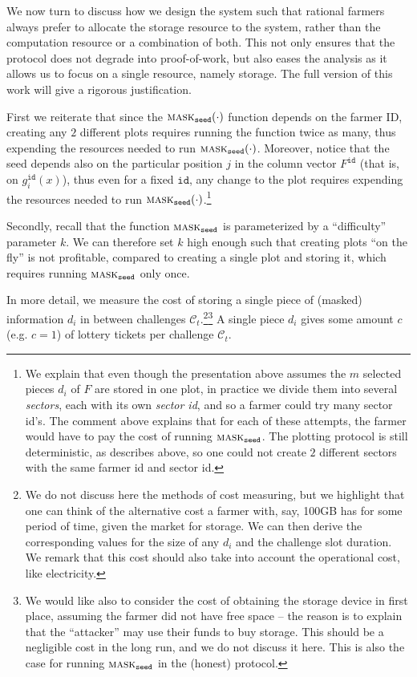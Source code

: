 \documentclass[conference]{IEEEtran}
\newcommand{\id}{\texttt{id}}
\newcommand{\seed}{\texttt{seed}}
\newcommand{\mask}{\textsc{mask}}
\begin{document}
We now turn to discuss how we design the system such that rational farmers always prefer to allocate the storage resource to the system, rather than the computation resource or a combination of both. This not only ensures that the protocol does not degrade into proof-of-work, but also eases the analysis as it allows us to focus on a single resource, namely storage. The full version of this work will give a rigorous justification.

First we reiterate that since the $\mask_{\seed}(\cdot)$ function depends on the farmer ID, creating any $2$ different plots requires running the function twice as many, thus expending the resources needed to run $\mask_{\seed}(\cdot)$. Moreover, notice that the seed depends also on the particular position $j$ in the column vector $F^{\id}$ (that is, on $g_i^{\id}(x)$), thus even for a fixed $\id$, any change to the plot requires expending the resources needed to run $\mask_{\seed}(\cdot)$.\footnote{We explain that even though the presentation above assumes the $m$ selected pieces $d_i$ of $F$ are stored in one plot, in practice we divide them into several \emph{sectors}, each with its own \emph{sector id}, and so a farmer could try many sector id's. The comment above explains that for each of these attempts, the farmer would have to pay the cost of running $\mask_{\seed}$. The plotting protocol is still deterministic, as describes above, so one could not create $2$ different sectors with the same farmer id and sector id.}

Secondly, recall that the function $\mask_{\seed}$ is parameterized by a ``difficulty'' parameter $k$. We can therefore set $k$ high enough such that creating plots ``on the fly'' is not profitable, compared to creating a single plot and storing it, which requires running $\mask_{\seed}$ only once.

In more detail, we measure the cost of storing a single piece of (masked) information $d_i$ in between challenges $\mathcal{C}_t$.\footnote{We do not discuss here the methods of cost measuring, but we highlight that one can think of the alternative cost a farmer with, say, 100GB has for some period of time, given the market for storage. We can then derive the corresponding values for the size of any $d_i$ and the challenge slot duration. We remark that this cost should also take into account the operational cost, like electricity.}\footnote{We would like also to consider the cost of obtaining the storage device in first place, assuming the farmer did not have free space -- the reason is to explain that the ``attacker'' may use their funds to buy storage. This should be a negligible cost in the long run, and we do not discuss it here. This is also the case for running $\mask_{\seed}$ in the (honest) protocol.} A single piece $d_i$ gives some amount $c$ (e.g. $c=1$) of lottery tickets per challenge $\mathcal{C}_t$.
\end{document}

